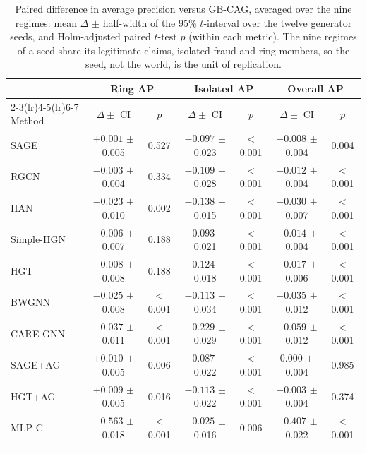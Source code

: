 \begin{table}[h]
\caption{Paired difference in average precision versus GB-CAG, averaged over the nine regimes: mean $\Delta$ $\pm$ half-width of the 95\% $t$-interval over the twelve generator seeds, and Holm-adjusted paired $t$-test $p$ (within each metric). The nine regimes of a seed share its legitimate claims, isolated fraud and ring members, so the seed, not the world, is the unit of replication.}\label{tab:pooled}
\scriptsize
\setlength{\tabcolsep}{4pt}
\begin{tabular}{@{}lcccccc@{}}
\toprule
 & \multicolumn{2}{c}{Ring AP} & \multicolumn{2}{c}{Isolated AP} & \multicolumn{2}{c}{Overall AP} \\
\cmidrule(lr){2-3}\cmidrule(lr){4-5}\cmidrule(lr){6-7}
Method & $\Delta \pm$ CI & $p$ & $\Delta \pm$ CI & $p$ & $\Delta \pm$ CI & $p$ \\
\midrule
SAGE & $+0.001$ $\pm$ 0.005 & 0.527 & $-0.097$ $\pm$ 0.023 & $<$0.001 & $-0.008$ $\pm$ 0.004 & 0.004 \\
RGCN & $-0.003$ $\pm$ 0.004 & 0.334 & $-0.109$ $\pm$ 0.028 & $<$0.001 & $-0.012$ $\pm$ 0.004 & $<$0.001 \\
HAN & $-0.023$ $\pm$ 0.010 & 0.002 & $-0.138$ $\pm$ 0.015 & $<$0.001 & $-0.030$ $\pm$ 0.007 & $<$0.001 \\
Simple-HGN & $-0.006$ $\pm$ 0.007 & 0.188 & $-0.093$ $\pm$ 0.021 & $<$0.001 & $-0.014$ $\pm$ 0.004 & $<$0.001 \\
HGT & $-0.008$ $\pm$ 0.008 & 0.188 & $-0.124$ $\pm$ 0.018 & $<$0.001 & $-0.017$ $\pm$ 0.006 & $<$0.001 \\
BWGNN & $-0.025$ $\pm$ 0.008 & $<$0.001 & $-0.113$ $\pm$ 0.034 & $<$0.001 & $-0.035$ $\pm$ 0.012 & $<$0.001 \\
CARE-GNN & $-0.037$ $\pm$ 0.011 & $<$0.001 & $-0.229$ $\pm$ 0.029 & $<$0.001 & $-0.059$ $\pm$ 0.012 & $<$0.001 \\
SAGE+AG & $+0.010$ $\pm$ 0.005 & 0.006 & $-0.087$ $\pm$ 0.022 & $<$0.001 & $0.000$ $\pm$ 0.004 & 0.985 \\
HGT+AG & $+0.009$ $\pm$ 0.005 & 0.016 & $-0.113$ $\pm$ 0.022 & $<$0.001 & $-0.003$ $\pm$ 0.004 & 0.374 \\
MLP-C & $-0.563$ $\pm$ 0.018 & $<$0.001 & $-0.025$ $\pm$ 0.016 & 0.006 & $-0.407$ $\pm$ 0.022 & $<$0.001 \\
\botrule
\end{tabular}
\end{table}